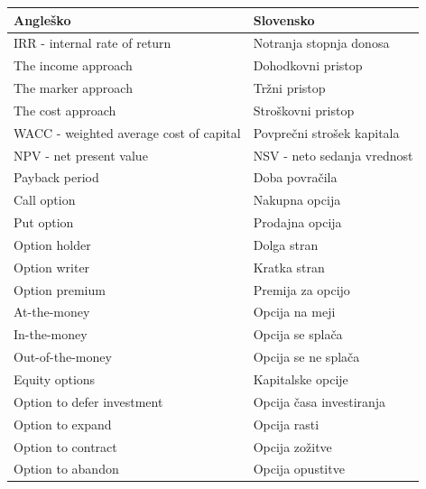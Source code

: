 \documentclass[12pt, a4paper]{amsart}
\theoremstyle{definition} %
\theoremstyle{plain} %
\begin{document}
\begin{table}[ht]
\centering
\setlength\extrarowheight{8pt}
\begin{tabular}{|l|l|}
\hline
\textbf{Angleško} & \textbf{Slovensko} \\
\hline
\hline
  IRR - internal rate of return      &  Notranja stopnja donosa         \\
\hline
    The income approach     &     Dohodkovni pristop      \\
\hline
    The marker approach     &    Tržni pristop      \\
\hline
      The cost approach   &     Stroškovni pristop      \\
\hline
      WACC -  weighted average cost of capital  &   Povprečni strošek kapitala        \\
\hline
  NPV - net present value  &        NSV - neto sedanja vrednost   \\
\hline
     Payback period    &      Doba povračila     \\
\hline
    Call option     &       Nakupna opcija    \\
\hline
    Put option     &      Prodajna opcija     \\
\hline
     Option holder    &       Dolga stran    \\
\hline
     Option writer    &       Kratka stran \\   
\hline
	Option premium & Premija za opcijo \\
\hline
	At-the-money & Opcija na meji \\
\hline
	In-the-money & Opcija se splača \\
\hline
	Out-of-the-money & Opcija se ne splača\\
\hline
	Equity options & Kapitalske opcije \\
\hline
	Option to defer investment & Opcija časa investiranja \\
\hline
	Option to expand & Opcija rasti \\
\hline
	Option to contract & Opcija zožitve \\
\hline
	Option to abandon & Opcija opustitve \\
\hline	
\end{tabular}
\end{table}
\end{document}
